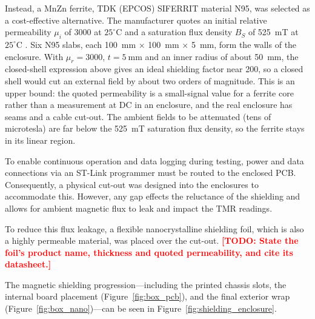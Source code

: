 \documentclass[12pt,a4paper]{article}
\newcommand{\todo}[1]{\textcolor{red}{\textbf{[TODO: #1]}}}
\begin{document}
Instead, a MnZn ferrite, TDK (EPCOS) SIFERRIT material N95, was selected as a cost-effective alternative. The manufacturer quotes an initial relative permeability $\mu_i$ of 3000 at $25^{\circ}\text{C}$ and a saturation flux density $B_S$ of \SI{525}{\milli\tesla} at $25^{\circ}\text{C}$ \cite{tdk_n95}. Six N95 slabs, each \SI{100}{\milli\metre} $\times$ \SI{100}{\milli\metre} $\times$ \SI{5}{\milli\metre}, form the walls of the enclosure. With $\mu_r = 3000$, $t = \SI{5}{\milli\metre}$ and an inner radius of about \SI{50}{\milli\metre}, the closed-shell expression above gives an ideal shielding factor near 200, so a closed shell would cut an external field by about two orders of magnitude. This is an upper bound: the quoted permeability is a small-signal value for a ferrite core rather than a measurement at DC in an enclosure, and the real enclosure has seams and a cable cut-out. The ambient fields to be attenuated (tens of microtesla) are far below the \SI{525}{\milli\tesla} saturation flux density, so the ferrite stays in its linear region.

To enable continuous operation and data logging during testing, power and data connections via an ST-Link programmer must be routed to the enclosed PCB. Consequently, a physical cut-out was designed into the enclosures to accommodate this. However, any gap effects the reluctance of the shielding and allows for ambient magnetic flux to leak and impact the TMR readings.

To reduce this flux leakage, a flexible nanocrystalline shielding foil, which is also a highly permeable material, was placed over the cut-out. \todo{State the foil's product name, thickness and quoted permeability, and cite its datasheet.}

The magnetic shielding progression—including the printed chassis slots, the internal board placement (Figure~\ref{fig:box_pcb}), and the final exterior wrap (Figure~\ref{fig:box_nano})—can be seen in Figure~\ref{fig:shielding_enclosure}.
\end{document}
